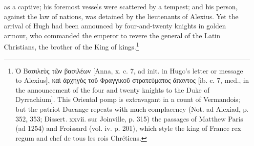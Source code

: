 as a captive; his foremost vessels were scattered by a tempest; and his person, against the law of nations, was detained by the lieutenants of Alexius. Yet the arrival of Hugh had been announced by four-and-twenty knights in golden armour, who commanded the emperor to revere the general of the Latin Christians, the brother of the King of kings.\footnote{\textgreek{\texthebrew{Ὁ} Βασιλε\texthebrew{ὺ}ς τ\texthebrew{ῶ}ν βασιλέων} [Anna, x. c. 7, ad init. in Hugo\texthebrew{}’s letter or message to Alexius], \textgreek{κα\texthebrew{ὶ ἀ}ρχηγ\texthebrew{ὸ}ς το\texthebrew{ῦ} Φραγγικο\texthebrew{ῦ} στρατεύματος \texthebrew{ἄ}παντος} [ib. c. 7, med., in the announcement of the four and twenty knights to the Duke of Dyrrachium]. This Oriental pomp is extravagant in a count of Vermandois; but the patriot Ducange repeats with much complacency (Not. ad Alexiad, p. 352, 353; Dissert. xxvii. sur Joinville, p. 315) the passages of Matthew Paris (ad 1254) and Froissard (vol. iv. p. 201), which style the king of France rex regum and chef de tous les rois Chrétiens.}

